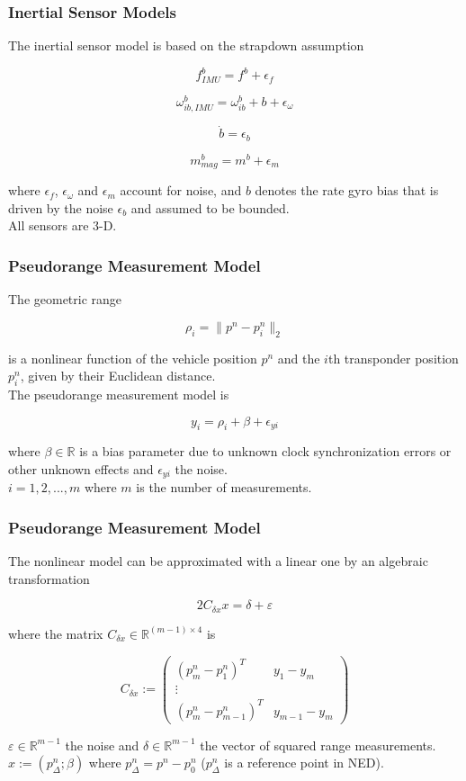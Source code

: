 \documentclass{beamer}
\begin{document}
	\begin{frame}
	\frametitle{Inertial Sensor Models}
	The inertial sensor model is based on the strapdown assumption
	
	\[ f^b_{IMU} = f^b + \epsilon_f\]
	
	\[ \omega^b_{ib,IMU} = \omega^b_{ib} + b + \epsilon_\omega \]
	
	\[ \dot{b} = \epsilon_b \]
	
	\[ m^b_{mag} = m^b + \epsilon_m \]
	
	where $\epsilon_f$, $\epsilon_\omega$ and $\epsilon_m$ account for noise, and $b$ denotes the rate gyro bias that is driven by the noise $\epsilon_b$ and assumed to be bounded.  
	\\ All sensors are 3-D.
	\end{frame}
	
	\begin{frame}
	\frametitle{Pseudorange Measurement Model}
	
	The geometric range 
	
	\[ \rho_i = \|p^n - p^n_i\|_2 \]
	
	is a nonlinear function of the vehicle position $p^n$ and the $i$th transponder position $p^n_i$, given by their Euclidean distance.
	\\ The pseudorange measurement model is
	
	\[ y_i = \rho_i + \beta + \epsilon_{yi} \]
	
	where $\beta \in \mathds{R}$ is a bias parameter due to unknown clock synchronization errors or other unknown effects and $\epsilon_{yi}$ the noise.
	\\ $i = 1,2,...,m$ where $m$ is the number of measurements.
	\end{frame}
	
	\begin{frame}
	\frametitle{Pseudorange Measurement Model}
	The nonlinear model can be approximated with a linear one by an algebraic transformation 
	
		\[ 2C_{\delta x}x = \delta + \varepsilon  \]
		
	where the matrix $C_{\delta x} \in \mathds{R}^{(m-1)\times4}$ is
	
	$$
	C_{\delta x} :=
	\begin{pmatrix}
	(p^n_m - p^n_1)^T & y_1 - y_m \\
	\vdots \\
	(p^n_m - p^n_{m-1})^T & y_{m-1} - y_m 
	\end{pmatrix} 
	$$
	
	$\varepsilon \in \mathds{R}^{m-1}$ the noise and $\delta \in \mathds{R}^{m-1}$ the vector of squared range measurements. \\ $x := (p^n_\Delta;\beta)$ where $p_\Delta^n = p^n - p^n_0$ ($p_\Delta^n$ is a reference point in NED). 
	\end{frame}
\end{document}
